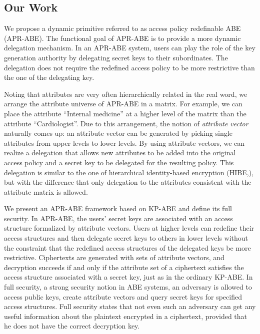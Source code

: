 \documentclass[twocolumn]{svjour3}          \smartqed  \usepackage{graphicx}
\begin{document}
\subsection{Our Work}
\label{contri}
We propose a dynamic primitive referred to as access policy redefinable ABE (APR-ABE). The functional goal of APR-ABE is to provide a more dynamic delegation mechanism. In an APR-ABE system, users can play the role of the key generation authority by delegating secret keys to their subordinates. The delegation does not require the redefined access policy to
be more restrictive than the one of the delegating key.

Noting that attributes are very
often hierarchically related in the real word,
we arrange the attribute universe of APR-ABE in a matrix.
For example, we can place the attribute ``Internal medicine''
at a higher level of the matrix than the attribute ``Cardiologist''.
Due to this arrangement, the notion of {\em attribute vector}
naturally comes up: an attribute vector can be generated by
picking single attributes from upper levels to lower levels.
By using attribute vectors, we can realize a delegation
that allows new attributes to be added into the original access policy
and a secret key to be delegated for the resulting policy.
This delegation is similar to the one of hierarchical identity-based
encryption (HIBE,\cite{BBG05}), but with the difference that
only delegation to the attributes consistent
with the attribute matrix is allowed.

We present an APR-ABE framework based on KP-ABE and define its
full security. In  APR-ABE, the users' secret keys are associated with
an access structure formalized by attribute vectors. Users
at higher levels can redefine their access structures and then
delegate secret keys to others in lower levels without the constraint that the redefined access structures of the delegated keys be more restrictive.
Ciphertexts are generated with sets of attribute vectors, and decryption succeeds if and only if the attribute set of a ciphertext satisfies the access structure associated with a secret key, just as in the ordinary KP-ABE.
In full security, a strong security notion in ABE systems, an adversary is allowed to access public keys, create attribute vectors and query secret keys for specified access structures. Full security states that
not even such an adversary can get any useful information about the plaintext encrypted in a ciphertext, provided that he does not have the correct decryption key.
\end{document}
